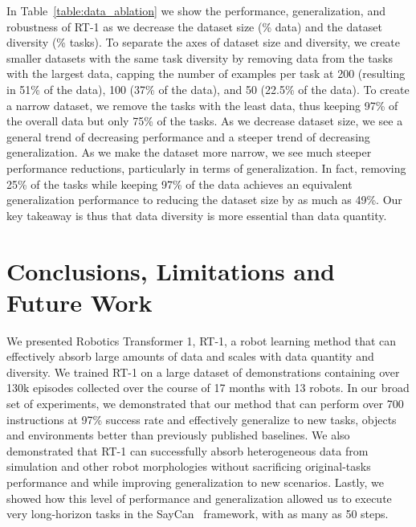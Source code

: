 \documentclass{article} %
\newcommand{\algname}{RT-1\xspace}
\newcommand{\algfullname}{Robotics Transformer 1\xspace}
\begin{document}
In Table~\ref{table:data_ablation} we show the performance, generalization, and robustness of \algname as we decrease the dataset size (\% data) and the dataset diversity (\% tasks). 
To separate the axes of dataset size and diversity, we create smaller datasets with the same task diversity by removing data from the tasks with the largest data, capping the number of examples per task at 200 (resulting in 51\% of the data), 100 (37\% of the data), and 50 (22.5\% of the data). 
To create a narrow dataset, we remove the tasks with the least data, thus keeping 97\% of the overall data but only 75\% of the tasks.
As we decrease dataset size, we see a general trend of decreasing performance and a steeper trend of decreasing generalization.
As we make the dataset more narrow, we see much steeper performance reductions, particularly in terms of generalization.
In fact, removing 25\% of the tasks while keeping 97\% of the data achieves an equivalent generalization performance to reducing the dataset size by as much as 49\%.
Our key takeaway is thus that data diversity is more essential than data quantity. 












\section{Conclusions, Limitations and Future Work}
\label{sec:conclusions}

We presented \algfullname, \algname, a robot learning method that can effectively absorb large amounts of data and scales with data quantity and diversity. We trained \algname on a large dataset of demonstrations containing over 130k episodes collected over the course of 17 months with 13 robots.
In our broad set of experiments, we demonstrated that our method that can perform over 700 instructions at 97\% success rate and effectively generalize to new tasks, objects and environments better than previously published baselines. 
We also demonstrated that \algname can successfully absorb heterogeneous data from simulation and other robot morphologies without sacrificing original-tasks performance and while improving generalization to new scenarios.
Lastly, we showed how this level of performance and generalization allowed us to execute very long-horizon tasks in the SayCan~\citep{ahn2022can} framework, with as many as 50 steps. 
\end{document}
